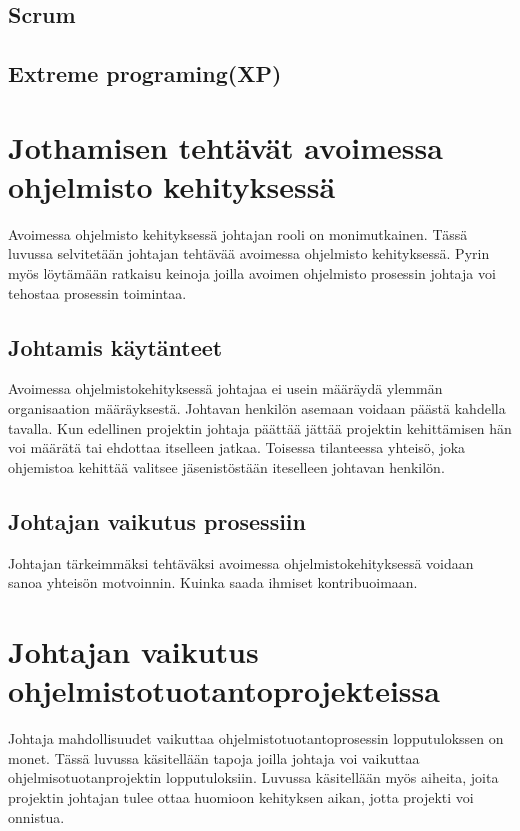\documentclass[finnish]{tktltiki2}
\theoremstyle{definition}
\theoremstyle{remark}
\begin{document}
\subsection{Scrum}

\subsection{Extreme programing(XP)}

\section{Jothamisen tehtävät avoimessa ohjelmisto kehityksessä}

Avoimessa ohjelmisto kehityksessä johtajan rooli on monimutkainen. Tässä luvussa selvitetään johtajan tehtävää avoimessa ohjelmisto kehityksessä. Pyrin myös löytämään ratkaisu keinoja joilla avoimen ohjelmisto prosessin johtaja voi tehostaa prosessin toimintaa.

\subsection{Johtamis käytänteet}

Avoimessa ohjelmistokehityksessä johtajaa ei usein määräydä ylemmän organisaation määräyksestä. Johtavan henkilön asemaan voidaan päästä kahdella tavalla. Kun edellinen projektin johtaja päättää jättää projektin kehittämisen hän voi määrätä tai ehdottaa itselleen jatkaa. Toisessa tilanteessa yhteisö, joka ohjemistoa kehittää valitsee jäsenistöstään iteselleen johtavan henkilön. ~\cite{Li:2006:MOS:1125170.1125182}

\subsection{Johtajan vaikutus prosessiin}

Johtajan tärkeimmäksi tehtäväksi avoimessa ohjelmistokehityksessä  voidaan sanoa yhteisön motvoinnin. Kuinka saada ihmiset kontribuoimaan.~\cite{Li:2006:MOS:1125170.1125182}


\section{Johtajan vaikutus ohjelmistotuotantoprojekteissa}

Johtaja mahdollisuudet vaikuttaa ohjelmistotuotantoprosessin lopputulokssen on monet. Tässä luvussa käsitellään tapoja joilla johtaja voi vaikuttaa ohjelmisotuotanprojektin lopputuloksiin. Luvussa käsitellään myös aiheita, joita projektin johtajan tulee ottaa huomioon kehityksen aikan, jotta projekti voi onnistua. 
\end{document}
